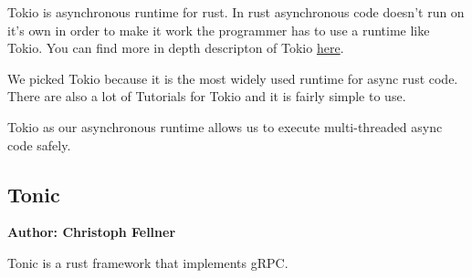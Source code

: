Tokio is asynchronous runtime for rust. In rust asynchronous code doesn't run on it's own in order to make it work the programmer has to use a runtime like Tokio. You can find more in depth descripton of Tokio \href{https://tokio.rs/tokio/tutorial}{here}. 

We picked Tokio because it is the most widely used runtime for async rust code. There are also a lot of Tutorials for Tokio and it is fairly simple to use.

Tokio as our asynchronous runtime allows us to execute multi-threaded async code safely.  

\subsection{Tonic}
\textbf{Author: Christoph Fellner}

Tonic is a rust framework that implements gRPC.

\filbreak
